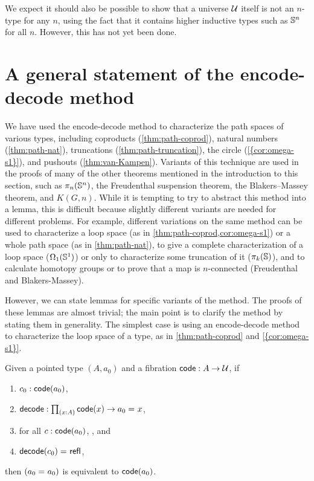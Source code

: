 We expect it should also be possible to show that a universe $\mathcal{U}$ itself is not an $n$-type for any $n$, using the fact that it contains higher inductive types such as $\mathbb{S}^n$ for all $n$.
However, this has not yet been done.

\section{A general statement of the encode-decode method}
\label{sec:general-encode-decode}

We have used the encode-decode method to characterize the path spaces
of various types, including coproducts (\cref{thm:path-coprod}), natural
numbers (\cref{thm:path-nat}), truncations (\cref{thm:path-truncation}),
the circle (\cref{{cor:omega-s1}}), and pushouts
(\cref{thm:van-Kampen}).  Variants of this technique are used in the
proofs of many of the other theorems mentioned in the introduction to
this section, such as $\pi_n(\mathbb{S}^n)$, the Freudenthal suspension
theorem, the Blakers--Massey theorem, and $K(G,n)$.  While it is tempting to try to
abstract this method into a lemma, this is difficult because
slightly different variants are needed for different problems.  For
example, different variations on the same method  can be used to
characterize a loop space (as in \cref{thm:path-coprod,cor:omega-s1}) or
a whole path space (as in \cref{thm:path-nat}), to give a complete
characterization of a loop space ($\Omega_1(\mathbb{S} ^1)$) or only to
characterize some truncation of it ($\pi_k(\mathbb{S})$), and to calculate
homotopy groups or to prove that a map is $n$-connected (Freudenthal and
Blakers-Massey).

However, we can state lemmas for specific variants of the method.
The proofs of these lemmas are almost trivial; the main point is to
clarify the method by stating them in generality.  The simplest
case is using an encode-decode method to characterize the loop space of a
type, as in \cref{thm:path-coprod} and \cref{{cor:omega-s1}}.

\begin{lem}
Given a pointed type $(A,a_0)$ and a fibration
$\mathsf{code} : A \to \mathcal{U}$, if 
\begin{enumerate}
\item $c_0 : \mathsf{code}(a_0)$,
\item $\decode : \prd{x:A} \code(x) \to \id{a_0}{x}$,
\item for all $c : \mathsf{code}(a_0)$, , and
\item $\mathsf{decode}(c_0) =_{} \mathsf{refl}_{}$,
\end{enumerate}
then $(a_0 =_{} a_0)$ is equivalent to $\mathsf{code}(a_0)$.
\end{lem}

